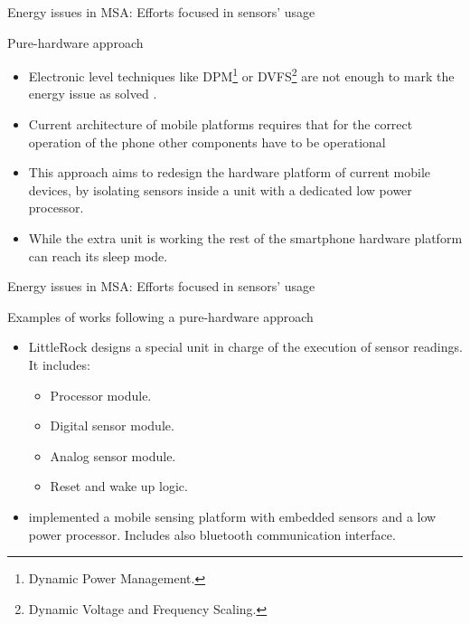 
\begin{frame}{Energy issues in MSA: Efforts focused in sensors' usage}
  \begin{block}{Pure-hardware approach}
    \begin{itemize}
      \item Electronic level techniques like DPM\footnote{Dynamic Power Management.} or DVFS\footnote{Dynamic Voltage and Frequency Scaling.} are not enough to mark the energy issue as solved \citep{Priyantha2011}.
      \item Current architecture of mobile platforms requires that for the correct operation of the phone other components have to be operational
      \item This approach aims to redesign the hardware platform of current mobile devices, by isolating sensors inside a unit with a dedicated low power processor.
      \item While the extra unit is working the rest of the smartphone hardware platform can reach its sleep mode.
    \end{itemize}
  \end{block}
\end{frame}

\begin{frame}{Energy issues in MSA: Efforts focused in sensors' usage}
  \begin{block}{Examples of works following a pure-hardware approach}
    \begin{itemize}
      \item LittleRock \citep{Priyantha2011} designs a special unit in charge of the execution of sensor readings.
      It includes:
      \begin{itemize}
        \item Processor module.
        \item Digital sensor module.
        \item Analog sensor module.
        \item Reset and wake up logic.
      \end{itemize}

      \item \citep{Choudhury2008} implemented a mobile sensing platform with embedded sensors and a low power processor.
      Includes also bluetooth communication interface.
    \end{itemize}
  \end{block}
\end{frame}

